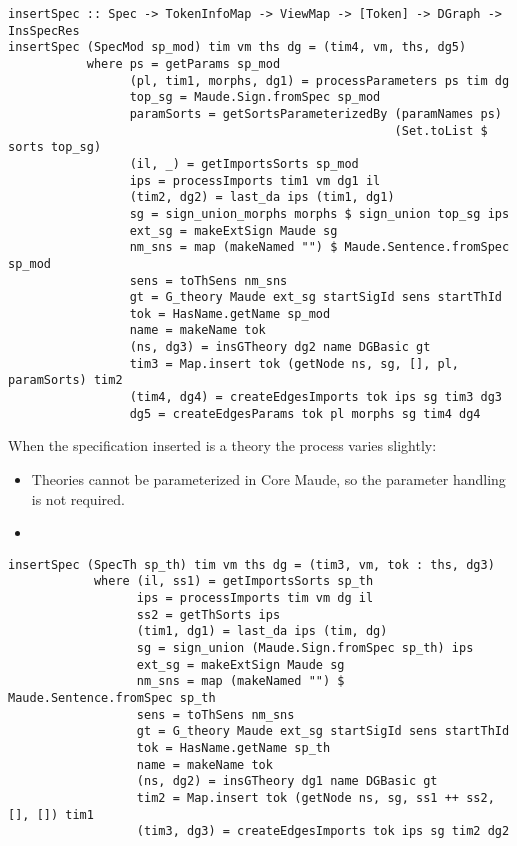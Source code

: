 {\codesize
\begin{verbatim}
insertSpec :: Spec -> TokenInfoMap -> ViewMap -> [Token] -> DGraph -> InsSpecRes
insertSpec (SpecMod sp_mod) tim vm ths dg = (tim4, vm, ths, dg5)
           where ps = getParams sp_mod
                 (pl, tim1, morphs, dg1) = processParameters ps tim dg
                 top_sg = Maude.Sign.fromSpec sp_mod
                 paramSorts = getSortsParameterizedBy (paramNames ps) 
                                                      (Set.toList $ sorts top_sg)
                 (il, _) = getImportsSorts sp_mod
                 ips = processImports tim1 vm dg1 il
                 (tim2, dg2) = last_da ips (tim1, dg1)
                 sg = sign_union_morphs morphs $ sign_union top_sg ips
                 ext_sg = makeExtSign Maude sg
                 nm_sns = map (makeNamed "") $ Maude.Sentence.fromSpec sp_mod
                 sens = toThSens nm_sns
                 gt = G_theory Maude ext_sg startSigId sens startThId
                 tok = HasName.getName sp_mod
                 name = makeName tok
                 (ns, dg3) = insGTheory dg2 name DGBasic gt
                 tim3 = Map.insert tok (getNode ns, sg, [], pl, paramSorts) tim2
                 (tim4, dg4) = createEdgesImports tok ips sg tim3 dg3
                 dg5 = createEdgesParams tok pl morphs sg tim4 dg4
\end{verbatim}
}

When the specification inserted is a theory the process varies slightly:

\begin{itemize}
\item Theories cannot be parameterized in Core Maude, so the parameter
handling is not required.
\item
\end{itemize}

{\codesize
\begin{verbatim}
insertSpec (SpecTh sp_th) tim vm ths dg = (tim3, vm, tok : ths, dg3)
            where (il, ss1) = getImportsSorts sp_th
                  ips = processImports tim vm dg il
                  ss2 = getThSorts ips
                  (tim1, dg1) = last_da ips (tim, dg)
                  sg = sign_union (Maude.Sign.fromSpec sp_th) ips
                  ext_sg = makeExtSign Maude sg
                  nm_sns = map (makeNamed "") $ Maude.Sentence.fromSpec sp_th
                  sens = toThSens nm_sns
                  gt = G_theory Maude ext_sg startSigId sens startThId
                  tok = HasName.getName sp_th
                  name = makeName tok
                  (ns, dg2) = insGTheory dg1 name DGBasic gt
                  tim2 = Map.insert tok (getNode ns, sg, ss1 ++ ss2, [], []) tim1
                  (tim3, dg3) = createEdgesImports tok ips sg tim2 dg2
\end{verbatim}
}

















